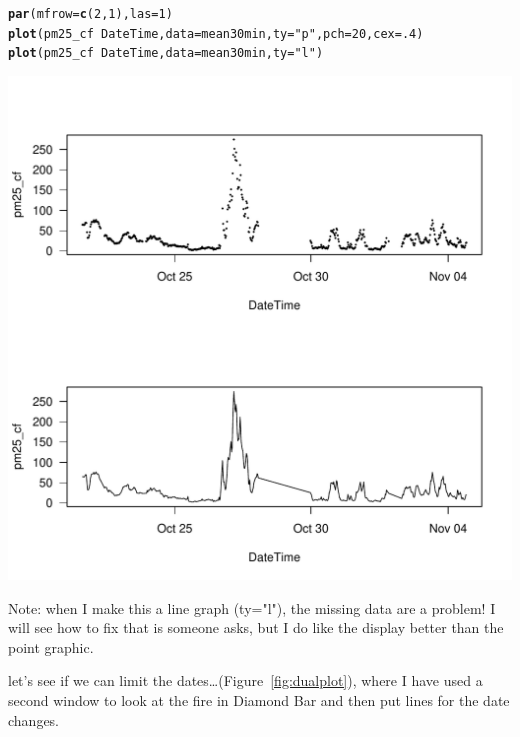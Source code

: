 \documentclass{article}\usepackage[]{graphicx}\usepackage[]{color}
\makeatletter
\def\maxwidth{ %
  \ifdim\Gin@nat@width>\linewidth
    \linewidth
  \else
    \Gin@nat@width
  \fi
}
\newcommand{\hlnum}[1]{\textcolor[rgb]{0.686,0.059,0.569}{#1}}%
\newcommand{\hlstr}[1]{\textcolor[rgb]{0.192,0.494,0.8}{#1}}%
\newcommand{\hlopt}[1]{\textcolor[rgb]{0,0,0}{#1}}%
\newcommand{\hlstd}[1]{\textcolor[rgb]{0.345,0.345,0.345}{#1}}%
\newcommand{\hlkwc}[1]{\textcolor[rgb]{0.333,0.667,0.333}{#1}}%
\newcommand{\hlkwd}[1]{\textcolor[rgb]{0.737,0.353,0.396}{\textbf{#1}}}%
\newenvironment{kframe}{%
 \def\at@end@of@kframe{}%
 \ifinner\ifhmode%
  \def\at@end@of@kframe{\end{minipage}}%
  \begin{minipage}{\columnwidth}%
 \fi\fi%
 \def\FrameCommand##1{\hskip\@totalleftmargin \hskip-\fboxsep
 \colorbox{shadecolor}{##1}\hskip-\fboxsep
     \hskip-\linewidth \hskip-\@totalleftmargin \hskip\columnwidth}%
 \MakeFramed {\advance\hsize-\width
   \@totalleftmargin\z@ \linewidth\hsize
   \@setminipage}}%
 {\par\unskip\endMakeFramed%
 \at@end@of@kframe}
\newenvironment{knitrout}{}{} %
\def\maxwidth{ %
  \ifdim\Gin@nat@width>\linewidth
    \linewidth
  \else
    \Gin@nat@width
  \fi
}
\makeatother
\begin{document}
\begin{knitrout}
\color{fgcolor}\begin{kframe}
\begin{alltt}
\hlkwd{par}\hlstd{(}\hlkwc{mfrow}\hlstd{=}\hlkwd{c}\hlstd{(}\hlnum{2}\hlstd{,}\hlnum{1}\hlstd{),} \hlkwc{las}\hlstd{=}\hlnum{1}\hlstd{)}
\hlkwd{plot}\hlstd{(pm25_cf} \hlopt{~} \hlstd{DateTime,} \hlkwc{data}\hlstd{=mean30min,} \hlkwc{ty}\hlstd{=}\hlstr{"p"}\hlstd{,} \hlkwc{pch}\hlstd{=}\hlnum{20}\hlstd{,} \hlkwc{cex}\hlstd{=}\hlnum{.4}\hlstd{)}
\hlkwd{plot}\hlstd{(pm25_cf} \hlopt{~} \hlstd{DateTime,} \hlkwc{data}\hlstd{=mean30min,} \hlkwc{ty}\hlstd{=}\hlstr{"l"}\hlstd{)}
\end{alltt}
\end{kframe}
\includegraphics[width=\maxwidth]{figure/unnamed-chunk-19-1} 

\end{knitrout}

Note: when I make this a line graph (ty="l"), the missing data are a problem!  I will see how to fix that is someone asks, but I do like the display better than the point graphic.

let's see if we can limit the dates\ldots (Figure~\ref{fig:dualplot}), where I have used a second window to look at the fire in Diamond Bar and then put lines for the date changes. 
\end{document}
